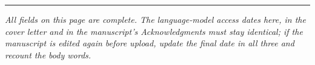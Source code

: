 \documentclass[11pt,letterpaper]{article}
\begin{document}
\vspace{1.2em}
\hrule
\vspace{0.5em}
{\small\itshape All fields on this page are complete. The language-model
access dates here, in the cover letter and in the manuscript's Acknowledgments
must stay identical; if the manuscript is edited again before upload, update
the final date in all three and recount the body words.}
\end{document}
